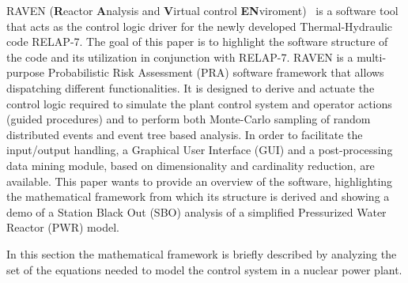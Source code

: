 \documentclass{mc2013}
\begin{document}
\setlength{\baselineskip}{14pt}
\normalsize



RAVEN (\textbf{R}eactor \textbf{A}nalysis and \textbf{V}irtual control \textbf{EN}viroment)~\cite{ravenFY12,mandelliANS2012} is a software tool that acts as the control logic driver for the newly developed Thermal-Hydraulic code RELAP-7. The goal of this paper is to highlight the software structure of the code and its utilization in conjunction with RELAP-7. RAVEN is a multi-purpose Probabilistic Risk Assessment (PRA) software framework that allows dispatching different functionalities. 
It is designed to derive and actuate the control logic required to simulate the plant control system and operator actions (guided procedures) and to perform both Monte-Carlo sampling of random distributed events and event tree based analysis. 
In order to facilitate the input/output handling, a Graphical User Interface (GUI) and a post-processing data mining module, based on dimensionality and cardinality reduction, are available.
This paper wants to provide an overview of the software, highlighting the mathematical framework from which its structure is derived and showing a demo of a Station Black Out (SBO) analysis of a simplified Pressurized Water Reactor (PWR) model.

\label{sec:mathFramework}

In this section the mathematical framework is briefly described by analyzing the set of the equations needed to model the control system in a nuclear power plant.
\end{document}
